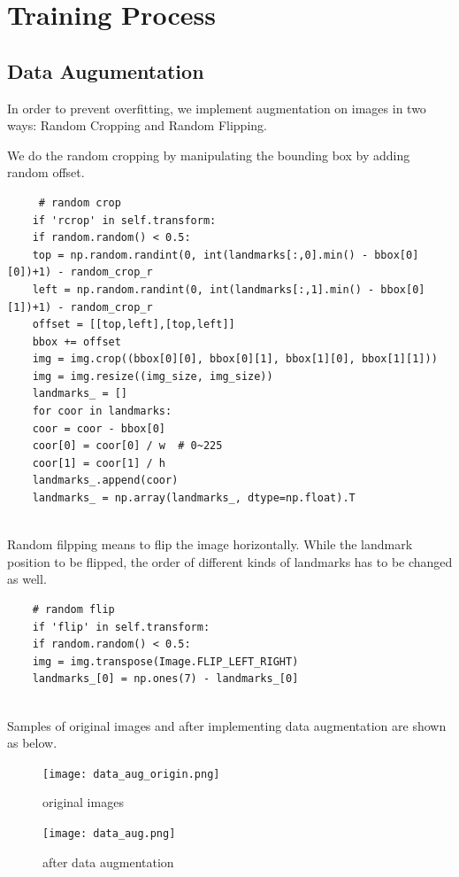 \documentclass{article}
\begin{document}
\section{Training Process}
\subsection{Data Augumentation}
In order to prevent overfitting, we implement augmentation on images in two ways: Random Cropping and Random Flipping.

We do the random cropping by manipulating the bounding box by adding random offset.

\begin{commandline}
	\begin{verbatim}
	 # random crop
	if 'rcrop' in self.transform:
	if random.random() < 0.5:
	top = np.random.randint(0, int(landmarks[:,0].min() - bbox[0][0])+1) - random_crop_r
	left = np.random.randint(0, int(landmarks[:,1].min() - bbox[0][1])+1) - random_crop_r
	offset = [[top,left],[top,left]]
	bbox += offset
	img = img.crop((bbox[0][0], bbox[0][1], bbox[1][0], bbox[1][1]))
	img = img.resize((img_size, img_size))
	landmarks_ = []
	for coor in landmarks:
	coor = coor - bbox[0]
	coor[0] = coor[0] / w  # 0~225
	coor[1] = coor[1] / h 
	landmarks_.append(coor)
	landmarks_ = np.array(landmarks_, dtype=np.float).T
	

	\end{verbatim}
\end{commandline}


Random filpping means to flip the image horizontally. While the landmark position to be flipped, the order of different kinds of landmarks has to be changed as well.

\begin{commandline}
	\begin{verbatim}
	# random flip
	if 'flip' in self.transform:
	if random.random() < 0.5:
	img = img.transpose(Image.FLIP_LEFT_RIGHT)
	landmarks_[0] = np.ones(7) - landmarks_[0]
	
	\end{verbatim}
\end{commandline}

Samples of original images and after implementing data augmentation are shown as below.

\begin{figure}[h]
	\begin{minipage}[t]{0.5\linewidth}
		\centering
		\texttt{[image: data\_aug\_origin.png]}
		\caption{original images}
		\label{fig:side:a}
	\end{minipage}%
	\begin{minipage}[t]{0.5\linewidth}
		\centering
		\texttt{[image: data\_aug.png]}
		\caption{after data augmentation}
		\label{fig:side:b}
	\end{minipage}
\end{figure}
\end{document}

